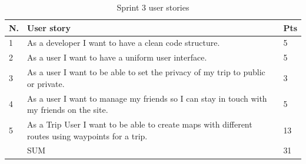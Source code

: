 \documentclass[a4paper]{article}
\begin{document}
\begin{table}[!h]
  \centering
  \begin{tabulary}{1.0\linewidth}{|L|L|L|}
    \hline
    N. & User story & Pts \\ & As a developer I want to have a clean code structure.
    & 5 \\ \hline

    2& As a user I want to have a uniform user interface.
    & 5 \\ \hline

    3& As a user I want to be able to set the privacy of my trip to public or private.
    & 3 \\ \hline

    4&As a user I want to manage my friends so I can stay in touch with my friends on the site.
    & 5 \\ \hline

    5& As a Trip User I want to be able to create maps with different routes using waypoints for a trip.
    & 13 \\ \hline

    & SUM & 31 \\ \hline
  \end{tabulary}
  \caption{Sprint 3 user stories}
\label{tab:sprint3}
\end{table}
\end{document}
